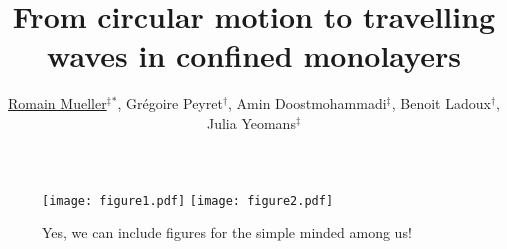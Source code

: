 \documentclass[a0,portrait]{a0poster}
\title{From circular motion to travelling waves in confined monolayers}
\author{\underline{Romain Mueller}${}^\ddagger{}^*$, Gr\'egoire Peyret${}^\dagger$, Amin Doostmohammadi${}^\ddagger$, Benoit Ladoux${}^\dagger$, Julia Yeomans${}^\ddagger$}
\begin{document}
\makeheader

\begin{posterrow}{1}

\begin{posterbox}
\blindtext
\end{posterbox}

\end{posterrow}


\begin{posterrow}{2}

\begin{posterbox}

\begin{figure}
  \texttt{[image: figure1.pdf]}
  \hspace{2\baselineskip}
  \texttt{[image: figure2.pdf]}
  \caption{%
  Yes, we can include figures for the simple minded among us!
  }
\end{figure}

\begin{multicols}{2}
\blindtext
\end{multicols}
\end{posterbox}

\begin{posterbox}

\blindtext

\blindtext

\end{posterbox}

\end{posterrow}

\begin{posterrow}{3}

\begin{posterbox}[Wow!]
\blindtext
\end{posterbox}

\begin{posterbox}[Such]
\blindtext
\end{posterbox}

\begin{posterbox}[Boxes!]
\blindtext
\end{posterbox}

\end{posterrow}
\end{document}
